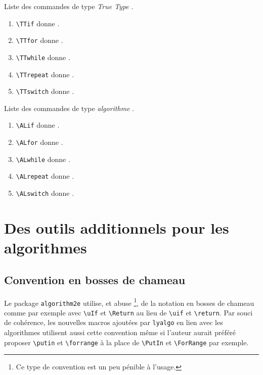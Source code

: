 \documentclass[12pt,a4paper]{article}
\theoremstyle{definition}
\newcommand\myquote[1]{{\itshape \og #1 \fg}}
\begin{document}

\begin{center}
	Liste des commandes de type \myquote{True Type}.
\end{center}

\begin{enumerate}
    \item \verb+\TTif+ donne \TTif.
    \item \verb+\TTfor+ donne \TTfor.
    \item \verb+\TTwhile+ donne \TTwhile.
    \item \verb+\TTrepeat+ donne \TTrepeat.
    \item \verb+\TTswitch+ donne \TTswitch.
\end{enumerate}

\begin{center}
	Liste des commandes de type \myquote{algorithme}.
\end{center}

\begin{enumerate}
    \item \verb+\ALif+ donne \ALif.
    \item \verb+\ALfor+ donne \ALfor.
    \item \verb+\ALwhile+ donne \ALwhile.
    \item \verb+\ALrepeat+ donne \ALrepeat.
    \item \verb+\ALswitch+ donne \ALswitch.
\end{enumerate}




\section{Des outils additionnels pour les algorithmes} \label{algo-extra}

\subsection{Convention en bosses de chameau}

Le package \verb+algorithm2e+ utilise, et abuse
\footnote{
	Ce type de convention est un peu pénible à l'usage.
},
de la notation en bosses de chameau comme par exemple avec \verb+\uIf+ et \verb+\Return+ au lieu de \verb+\uif+ et \verb+\return+.
Par souci de cohérence, les nouvelles macros ajoutées par \verb+lyalgo+ en lien avec les algorithmes utilisent aussi cette convention même si l'auteur aurait préféré proposer \verb+\putin+ et \verb+\forrange+ à la place de \verb+\PutIn+ et \verb+\ForRange+ par exemple.
\end{document}
